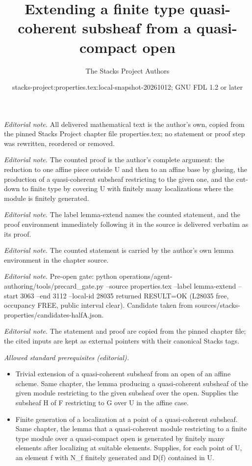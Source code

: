 \documentclass[10pt,a4paper]{amsart}
\title{Extending a finite type quasi-coherent subsheaf from a quasi-compact open}
\author{The Stacks Project Authors}
\date{stacks-project:properties.tex:local-snapshot-20261012; GNU FDL 1.2 or later}
\theoremstyle{plain}
\theoremstyle{definition}
\theoremstyle{remark}
\numberwithin{equation}{subsection}
\begin{document}
\maketitle
\noindent\textit{Editorial note.} All delivered mathematical text is the author's own, copied from the pinned Stacks Project chapter file properties.tex; no statement or proof step was rewritten, reordered or removed.\par\medskip
\noindent\textit{Editorial note.} The counted proof is the author's complete argument: the reduction to one affine piece outside U and then to an affine base by glueing, the production of a quasi-coherent subsheaf restricting to the given one, and the cut-down to finite type by covering U with finitely many localizations where the module is finitely generated.\par\medskip
\noindent\textit{Editorial note.} The label lemma-extend names the counted statement, and the proof environment immediately following it in the source is delivered verbatim as its proof.\par\medskip
\noindent\textit{Editorial note.} The counted statement is carried by the author's own lemma environment in the chapter source.\par\medskip
\noindent\textit{Editorial note.} Pre-open gate: python operations/agent-authoring/tools/precard\_gate.py --source properties.tex --label lemma-extend --start 3063 --end 3112 --local-id 28035 returned RESULT=OK (L28035 free, occupancy FREE, public interval clear). Candidate taken from sources/stacks-properties/candidates-halfA.json.\par\medskip
\noindent\textit{Editorial note.} The statement and proof are copied from the pinned chapter file; the cited inputs are kept as external pointers with their canonical Stacks tags.\par\medskip
\noindent\textit{Allowed standard prerequisites (editorial).}\begin{itemize}
\item Trivial extension of a quasi-coherent subsheaf from an open of an affine scheme. Same chapter, the lemma producing a quasi-coherent subsheaf of the given module restricting to the given subsheaf over the open. Supplies the subsheaf H of F restricting to G over U in the affine case.
\item Finite generation of a localization at a point of a quasi-coherent subsheaf. Same chapter, the lemma that a quasi-coherent module restricting to a finite type module over a quasi-compact open is generated by finitely many elements after localizing at suitable elements. Supplies, for each point of U, an element f with N\_f finitely generated and D(f) contained in U.
\end{itemize}\medskip
\end{document}
